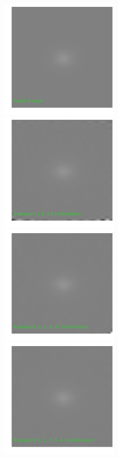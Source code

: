 \documentclass[12pt,preprint]{aastex6}
\begin{document}
\begin{figure}[!htbp]
\centering
\advance\leftskip-1.0cm
\advance\rightskip-1.0cm
\hspace{3.5cm}
\includegraphics[height=60mm,width=60mm]{f5a.png}
\newline
\includegraphics[height=60mm,width=60mm]{f5b.png}
\includegraphics[height=60mm,width=60mm]{f5c.png}
\includegraphics[height=60mm,width=60mm]{f5d.png}

\end{figure}
\end{document}
